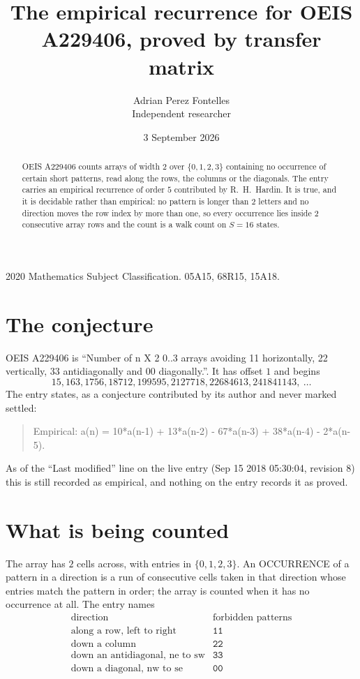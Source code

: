 \documentclass[11pt,a4paper]{article}
\title{The empirical recurrence for OEIS A229406, proved by transfer matrix}
\author{Adrian Perez Fontelles\\ \small Independent researcher}
\date{3 September 2026}
\theoremstyle{plain}
\theoremstyle{definition}
\begin{document}
\maketitle

\begin{abstract}
OEIS A229406 counts arrays of width $2$ over $\{0,1,2,3\}$ containing no occurrence of certain short
patterns, read along the rows, the columns or the diagonals. The entry carries an empirical
recurrence of order $5$ contributed by R.~H.~Hardin. It is true, and it is decidable
rather than empirical: no pattern is longer than $2$ letters and no direction moves the row
index by more than one, so every occurrence lies inside $2$ consecutive array rows and the
count is a walk count on $S=16$ states.
\end{abstract}

\noindent\small 2020 Mathematics Subject Classification. 05A15, 68R15, 15A18.\normalsize

\section{The conjecture}

OEIS A229406 is ``Number of n X 2 0..3 arrays avoiding 11 horizontally, 22 vertically, 33 antidiagonally and 00 diagonally.''. It has offset $1$ and begins
\[
15, 163, 1756, 18712, 199595, 2127718, 22684613, 241841143,\ \dots
\]
The entry states, as a conjecture contributed by its author and never marked settled:
\begin{quote}
Empirical: a(n) = 10*a(n-1) + 13*a(n-2) - 67*a(n-3) + 38*a(n-4) - 2*a(n-5).
\end{quote}
As of the ``Last modified'' line on the live entry (Sep 15 2018 05:30:04, revision 8) this is still
recorded as empirical, and nothing on the entry records it as proved.

\section{What is being counted}

The array has $2$ cells across, with entries in $\{0,1,2,3\}$. An OCCURRENCE of a pattern in a
direction is a run of consecutive cells taken in that direction whose entries match the pattern
in order; the array is counted when it has no occurrence at all. The entry names
\[
\begin{array}{ll}
\text{direction} & \text{forbidden patterns} \\[2pt]
\text{along a row, left to right} & \mathtt{11} \\
\text{down a column} & \mathtt{22} \\
\text{down an antidiagonal, ne to sw} & \mathtt{33} \\
\text{down a diagonal, nw to se} & \mathtt{00} \\
\end{array}
\]
\end{document}
